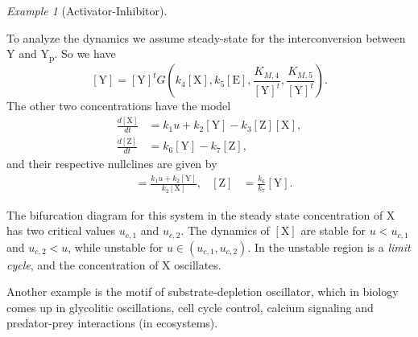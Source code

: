 \documentclass[a4paper]{article}
\newcommand{\co}[1]{[\text{#1}]} %
\theoremstyle{plain}
\theoremstyle{definition}
\theoremstyle{remark}
\newtheorem*{example}{Example}
\begin{document}
\begin{example}[Activator-Inhibitor]
\begin{center}
  \end{center}
  To analyze the dynamics we assume steady-state for the interconversion
  between Y and Y\textsubscript{p}. So we have
  \begin{equation} \label{eqn:osc-y-yp-ss}
    \co{Y} = \co{Y}^t G\left(
      k_4 \co{X}, k_5 \co{E}, \frac{K_{M,4}}{\co{Y}^t}, \frac{K_{M,5}}{\co{Y}^t}
    \right).
  \end{equation}
  The other two concentrations have the model
  \begin{align*}
    \frac{d\co{X}}{dt} &= k_1 u + k_2 \co{Y} - k_3 \co{Z} \co{X}, \\
    \frac{d\co{Z}}{dt} &= k_6 \co{Y} - k_7 \co{Z},
  \end{align*}
  and their respective nullclines are given by
  \begin{align*}
    \co{Z} &= \frac{k_1 u + k_2 \co{Y}}{k_2 \co{X}}, &
    \co{Z} &= \frac{k_6}{k_7} \co{Y}.
  \end{align*}

  The bifurcation diagram for this system in the steady state concentration of
  X has two critical values $u_{c,1}$ and $u_{c,2}$. The dynamics of $\co{X}$
  are stable for $u < u_{c,1}$ and $u_{c,2} < u$, while unstable for $u \in
  (u_{c,1}, u_{c,2})$. In the unstable region is a \emph{limit cycle}, and the
  concentration of X oscillates.
\end{example}

Another example is the motif of substrate-depletion oscillator, which in
biology comes up in glycolitic oscillations, cell cycle control, calcium
signaling and predator-prey interactions (in ecosystems).
\end{document}
